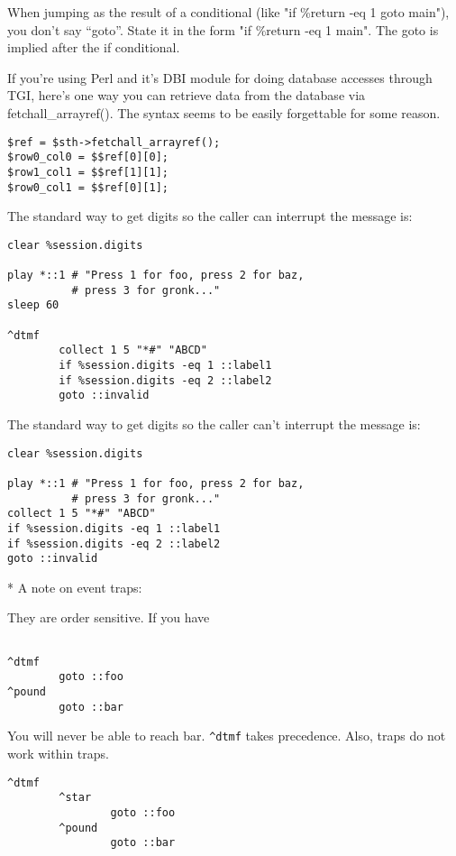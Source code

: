 \documentclass[a4paper,12pt]{article}
\begin{document}
{{{{{{{{When jumping as the result of a conditional (like "if \%return -eq 1
goto main"), you don't say ``goto''.  State it in the form "if \%return -eq 1
main".  The goto is implied after the if conditional.

If you're using Perl and it's DBI module for doing database accesses
through TGI, here's one way you can retrieve data from the database
via fetchall\_arrayref().  The syntax seems to be easily forgettable
for some reason.

\begin{verbatim}
$ref = $sth->fetchall_arrayref();
$row0_col0 = $$ref[0][0];
$row1_col1 = $$ref[1][1];
$row0_col1 = $$ref[0][1];
\end{verbatim}

The standard way to get digits so the caller can interrupt the message is:

\begin{verbatim}
clear %session.digits

play *::1 # "Press 1 for foo, press 2 for baz,
          # press 3 for gronk..."
sleep 60

^dtmf
        collect 1 5 "*#" "ABCD"
        if %session.digits -eq 1 ::label1
        if %session.digits -eq 2 ::label2
        goto ::invalid
\end{verbatim}

The standard way to get digits so the caller can't interrupt the message is:

\begin{verbatim}
clear %session.digits

play *::1 # "Press 1 for foo, press 2 for baz,
          # press 3 for gronk..."
collect 1 5 "*#" "ABCD"
if %session.digits -eq 1 ::label1
if %session.digits -eq 2 ::label2
goto ::invalid
\end{verbatim}

* A note on event traps:

They are order sensitive.  If you have 

\begin{verbatim}

^dtmf
        goto ::foo
^pound
        goto ::bar
\end{verbatim}

You will never be able to reach bar.  \verb|^dtmf| takes precedence.  Also, traps do not work within traps.

\begin{verbatim}
^dtmf
        ^star
                goto ::foo
        ^pound
                goto ::bar
\end{verbatim}

}}}}}}}}
\end{document}
